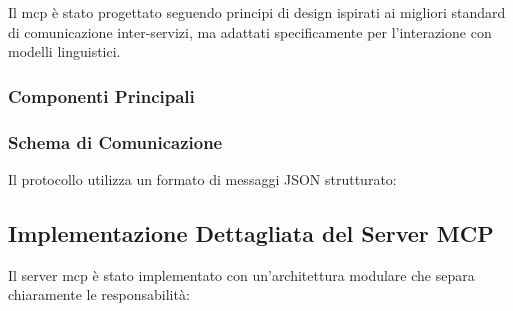 Il \gls{mcp} è stato progettato seguendo principi di design ispirati ai migliori standard di comunicazione inter-servizi, ma adattati specificamente per l'interazione con modelli linguistici.

\subsubsection{Componenti Principali}

\subsubsection{Schema di Comunicazione}
Il protocollo utilizza un formato di messaggi JSON strutturato:

\begin{listing}[H]
\caption{Struttura di una richiesta MCP}
\label{listing:mcp-request-structure}
\end{listing}

\subsection{Implementazione Dettagliata del Server MCP}
Il server \gls{mcp} è stato implementato con un'architettura modulare che separa chiaramente le responsabilità:

